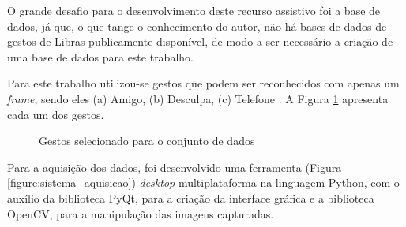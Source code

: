 \par O grande desafio para o desenvolvimento deste recurso assistivo foi a base de dados, já que, o que tange o conhecimento do autor, não há bases de dados de gestos de Libras publicamente disponível, de modo a ser necessário a criação de uma base de dados para este trabalho.

\par Para este trabalho utilizou-se gestos que podem ser reconhecidos com apenas um \textit{frame}, sendo eles (a) Amigo, (b) Desculpa, (c) Telefone \cite{Magalh2018}. A Figura \ref{figure:gestos_selecionados} apresenta cada um dos gestos.

\begin{figure}[H]%
    \centering
    \qquad
    \qquad
    \qquad
    \caption{Gestos selecionado para o conjunto de dados}%
    \label{figure:gestos_selecionados}%
\end{figure}

\par Para a aquisição dos dados, foi desenvolvido uma ferramenta (Figura \ref{figure:sistema_aquisicao}) \textit{desktop} multiplataforma na linguagem Python, com o auxílio da biblioteca PyQt, para a criação da interface gráfica e a biblioteca OpenCV, para a manipulação das imagens capturadas.

